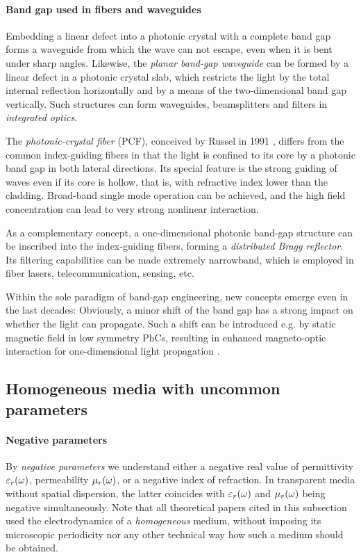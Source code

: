 \paragraph{Band gap used in fibers and waveguides} %
Embedding a linear defect into a photonic crystal with a complete band gap forms a waveguide from which the wave can not escape, even when it is bent under sharp angles.
Likewise, the \textit{planar band-gap waveguide} can be formed by a linear defect in a photonic crystal slab, which restricts the light by the total internal reflection horizontally and by a means of the two-dimensional band gap vertically. Such structures can form waveguides, beamsplitters and filters in \textit{integrated optics}. 

The \textit{photonic-crystal fiber} (PCF), conceived by Russel in 1991 \cite{russell2007photonic}, differs from the common index-guiding fibers in that the light is confined to its core by a photonic band gap in both lateral directions. 
Its special feature is the strong guiding of waves even if its core is hollow, that is, with refractive index lower than the cladding. Broad-band single mode operation can be achieved, and the high field concentration can lead to very strong nonlinear interaction.

As a complementary concept, a one-dimensional photonic band-gap structure can be inscribed into the index-guiding fibers, forming a \textit{distributed Bragg reflector}. Its filtering capabilities can be made extremely narrowband, which is employed in fiber lasers, telecommunication, sensing, etc. %

Within the sole paradigm of band-gap engineering, new concepts emerge even in the last decades: Obviously, a minor shift of the band gap has a strong impact on whether the light can propagate. Such a shift can be introduced e.g. by static magnetic field in low symmetry PhCs, resulting in enhanced magneto-optic interaction for one-dimensional light propagation \cite{vanwolleghem2009unidirectional}.


\subsection{Homogeneous media with uncommon parameters} 
\paragraph{Negative parameters}%
By \textit{negative parameters} we  understand either a negative real value of permittivity $\varepsilon_r(\omega)$, permeability $\mu_r(\omega)$, 
or a negative index of refraction. In transparent media without spatial dispersion, the latter coincides with $\varepsilon_r(\omega)$ and $\mu_r(\omega)$  being negative simultaneously.  %
Note that all theoretical papers cited in this subsection used the electrodynamics of a \textit{homogeneous} medium, without imposing its microscopic periodicity nor any other technical way how such a medium should be obtained. 

